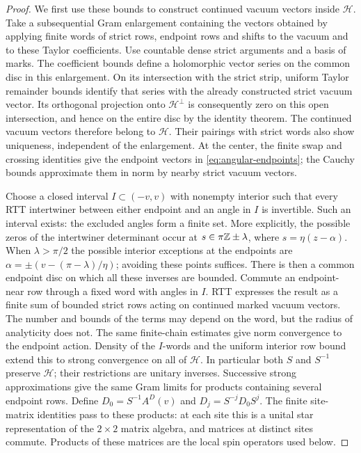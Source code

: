 \begin{proof}
We first use these bounds to construct continued vacuum vectors inside
$\mathcal H$. Take a subsequential Gram enlargement containing the
vectors obtained
by applying finite words of strict rows, endpoint rows and shifts to
the vacuum and to these Taylor coefficients. Use countable dense strict
arguments and a basis of marks. The coefficient bounds define a holomorphic vector series on the common
disc in this enlargement. On its intersection with the strict strip,
uniform Taylor remainder bounds identify that series with the already
constructed strict vacuum vector. Its orthogonal projection onto
$\mathcal H^\perp$ is consequently zero on this open intersection,
and hence on the entire disc by the identity theorem. The continued
vacuum vectors therefore belong to $\mathcal H$. Their pairings with
strict words also show uniqueness, independent of the enlargement.
At the center, the finite swap and crossing identities give the
endpoint vectors in \eqref{eq:angular-endpoints}; the Cauchy bounds
approximate them in norm by nearby strict vacuum vectors.

Choose a closed interval $I\subset(-v,v)$ with nonempty interior such
that every RTT intertwiner between either endpoint and an angle in
$I$ is invertible.  Such an interval exists: the excluded angles form a
finite set.  More explicitly, the possible zeros of the intertwiner
determinant occur at $s\in\pi\mathbb Z\pm\lambda$, where
$s=\eta(z-\alpha)$.  When $\lambda>\pi/2$ the possible interior
exceptions at the endpoints are
$\alpha=\pm(v-(\pi-\lambda)/\eta)$; avoiding these points suffices.
There is then a common endpoint disc on which all these inverses are
bounded.  Commute an endpoint-near row through a fixed word with angles
in $I$.  RTT expresses the result as a finite sum of bounded strict
rows acting on continued marked vacuum vectors.  The number and bounds
of the terms may depend on the word, but the radius of analyticity
does not.  The same finite-chain estimates give norm convergence to the
endpoint action.  Density of the $I$-words and the uniform interior row
bound extend this to strong convergence on all of $\mathcal H$.
In particular both $S$ and $S^{-1}$ preserve $\mathcal H$; their
restrictions are unitary inverses.  Successive strong approximations
give the same Gram limits for products containing several endpoint rows.
Define $D_0=S^{-1}A^D(v)$ and $D_j=S^{-j}D_0S^j$. The finite
site-matrix identities pass to these products: at each site this is a
unital star representation of the $2\times2$ matrix algebra, and
matrices at distinct sites commute. Products of these matrices are the
local spin operators used below.


\end{proof}
